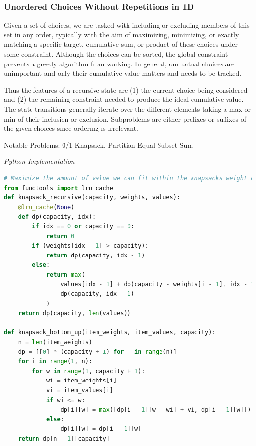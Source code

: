 \documentclass{article}
\newcommand{\comment}[1]{}
\begin{document}
\subsubsection*{Unordered Choices Without Repetitions in 1D}

\comment{
Input: choice array can be reordered, constraint 

dimension doesn't matter much

though a greedy heuristic may improve the time taken for an exhaustive search to find an optimal solution in which case we would want to sort our choices in descending order

Given a knapsack with a maximum weight capacity and a list of items with value and weights, maximize the amount of value we can fit within the knapsacks weight capacity.

TC: O(N*M), SC: O(N)
}

Given a set of choices, we are tasked with including or excluding members of this set in any order, typically with the aim of maximizing, minimizing, or exactly matching a specific target, cumulative sum, or product of these choices under some constraint. Although the choices can be sorted, the global constraint prevents a greedy algorithm from working. In general, our actual choices are unimportant and only their cumulative value matters and needs to be tracked. 

Thus the features of a recursive state are (1) the current choice being considered and (2) the remaining constraint needed to produce the ideal cumulative value. The state transitions generally iterate over the different elements taking a max or min of their inclusion or exclusion. Subproblems are either prefixes or suffixes of the given choices since ordering is irrelevant.

Notable Problems: 0/1 Knapsack, Partition Equal Subset Sum

\vspace{8pt} \emph{Python Implementation}
\begin{lstlisting}[language=Python]
# Maximize the amount of value we can fit within the knapsacks weight capacity
from functools import lru_cache
def knapsack_recursive(capacity, weights, values):
    @lru_cache(None)
    def dp(capacity, idx):
        if idx == 0 or capacity == 0:
            return 0
        if (weights[idx - 1] > capacity):
            return dp(capacity, idx - 1)
        else:
            return max(
                values[idx - 1] + dp(capacity - weights[i - 1], idx - 1),
                dp(capacity, idx - 1)
            )
    return dp(capacity, len(values))

def knapsack_bottom_up(item_weights, item_values, capacity):
    n = len(item_weights)
    dp = [[0] * (capacity + 1) for _ in range(n)]
    for i in range(1, n):
        for w in range(1, capacity + 1):
            wi = item_weights[i]
            vi = item_values[i]
            if wi <= w:
                dp[i][w] = max([dp[i - 1][w - wi] + vi, dp[i - 1][w]])
            else:
                dp[i][w] = dp[i - 1][w]
    return dp[n - 1][capacity]
\end{lstlisting}
\end{document}
